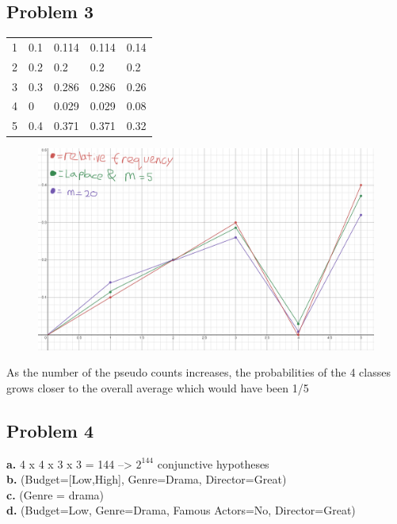 \documentclass[letter]{article}
\theoremstyle{case}
\begin{document}
\subsection*{Problem 3}
\begin{table}[!h]
\begin{tabular}{lllll}
1 & 0.1 & 0.114 & 0.114 & 0.14 \\
2 & 0.2 & 0.2   & 0.2   & 0.2  \\
3 & 0.3 & 0.286 & 0.286 & 0.26 \\
4 & 0   & 0.029 & 0.029 & 0.08 \\
5 & 0.4 & 0.371 & 0.371 & 0.32
\end{tabular}
\end{table}
\begin{figure}[h!]
	\includegraphics[scale=0.4]{all.png}
\end{figure} 
As the number of the pseudo counts increases, the probabilities of the 4 classes grows closer to the overall average which would have been 1/5
\newpage
\subsection*{Problem 4}
\textbf{a. } 4 x 4 x 3 x 3 = 144 --> $2^{144}$ conjunctive hypotheses \\
\textbf{b. } (Budget=[Low,High], Genre=Drama, Director=Great) \\
\textbf{c. } (Genre = drama) \\
\textbf{d. } (Budget=Low, Genre=Drama, Famous Actors=No, Director=Great)
\end{document}
